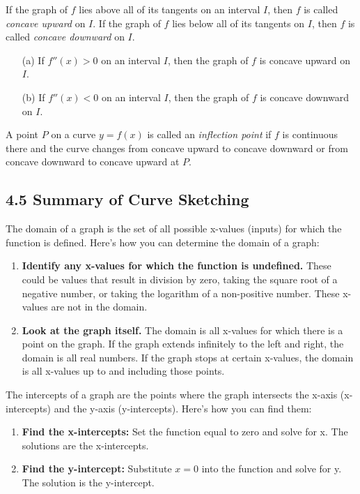 \documentclass{article}
\begin{document}
If the graph of $f$ lies above all of its tangents on an interval $I$, then $f$ is called \textit{concave upward} on $I$. If the graph of $f$ lies below all of its tangents on $I$, then $f$ is called \textit{concave downward} on $I$.
\begin{enumerate}
    \item[(a)] If $f''(x) > 0$ on an interval $I$, then the graph of $f$ is concave upward on $I$.
    \item[(b)] If $f''(x) < 0$ on an interval $I$, then the graph of $f$ is concave downward on $I$.
\end{enumerate}

A point $P$ on a curve $y = f(x)$ is called an \textit{inflection point} if $f$ is continuous there and the curve changes from concave upward to concave downward or from concave downward to concave upward at $P$.

\subsection{4.5 Summary of Curve Sketching}

The domain of a graph is the set of all possible x-values (inputs) for which the function is defined. Here's how you can determine the domain of a graph:

\begin{enumerate}
    \item \textbf{Identify any x-values for which the function is undefined.} These could be values that result in division by zero, taking the square root of a negative number, or taking the logarithm of a non-positive number. These x-values are not in the domain.
    \item \textbf{Look at the graph itself.} The domain is all x-values for which there is a point on the graph. If the graph extends infinitely to the left and right, the domain is all real numbers. If the graph stops at certain x-values, the domain is all x-values up to and including those points.
\end{enumerate}

The intercepts of a graph are the points where the graph intersects the x-axis (x-intercepts) and the y-axis (y-intercepts). Here's how you can find them:

\begin{enumerate}
    \item \textbf{Find the x-intercepts:} Set the function equal to zero and solve for x. The solutions are the x-intercepts.
    \item \textbf{Find the y-intercept:} Substitute $x = 0$ into the function and solve for y. The solution is the y-intercept.
\end{enumerate}
\end{document}
